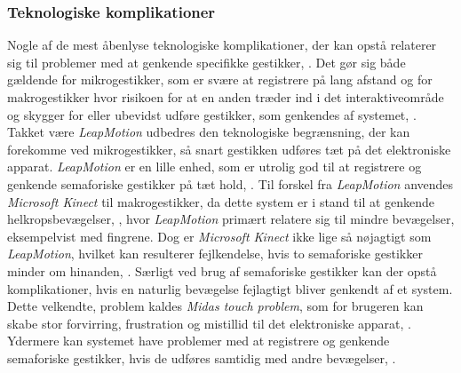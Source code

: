 \subsubsection{Teknologiske komplikationer}
\label{TeknologiskeKomplikationer}
%
Nogle af de mest åbenlyse teknologiske komplikationer, der kan opstå relaterer sig til problemer med at genkende specifikke gestikker, \parencite[s. 27]{PDF:ATaxonomyOfGestures}. Det gør sig både gældende for mikrogestikker, som er svære at registrere på lang afstand og for makrogestikker hvor risikoen for at en anden træder ind i det interaktiveområde og skygger for eller ubevidst udføre gestikker, som genkendes af systemet, \parencite[s. 9]{PDF:UsabilityofMicroVsMacroGestures}. Takket være \textit{LeapMotion} udbedres den teknologiske begrænsning, der kan forekomme ved mikrogestikker, så snart gestikken udføres tæt på det elektroniske apparat. \textit{LeapMotion} er en lille enhed, som er utrolig god til at registrere og genkende semaforiske gestikker på tæt hold, \parencite[s. 7]{PDF:UsabilityofMicroVsMacroGestures}. Til forskel fra \textit{LeapMotion} anvendes \textit{Microsoft Kinect} til makrogestikker, da dette system er i stand til at genkende helkropsbevægelser, \parencite[s. 4]{PDF:UsabilityofMicroVsMacroGestures}, hvor \textit{LeapMotion} primært relatere sig til mindre bevægelser, eksempelvist med fingrene. Dog er \textit{Microsoft Kinect} ikke lige så nøjagtigt som \textit{LeapMotion}, hvilket kan resulterer fejlkendelse, hvis to semaforiske gestikker minder om hinanden, \parencite[s. 3]{PDF:UsabilityofMicroVsMacroGestures}. \blankline
%
Særligt ved brug af semaforiske gestikker kan der opstå komplikationer, hvis en naturlig bevægelse fejlagtigt bliver genkendt af et system. Dette velkendte, problem kaldes \textit{Midas touch problem}, som for brugeren kan skabe stor forvirring, frustration og mistillid til det elektroniske apparat, \parencite[s. 109]{PDF:PIMicrogesturesKap5}. Ydermere kan systemet have problemer med at registrere og genkende semaforiske gestikker, hvis de udføres samtidig med andre bevægelser, \parencite[s. 27]{PDF:ATaxonomyOfGestures}. 

